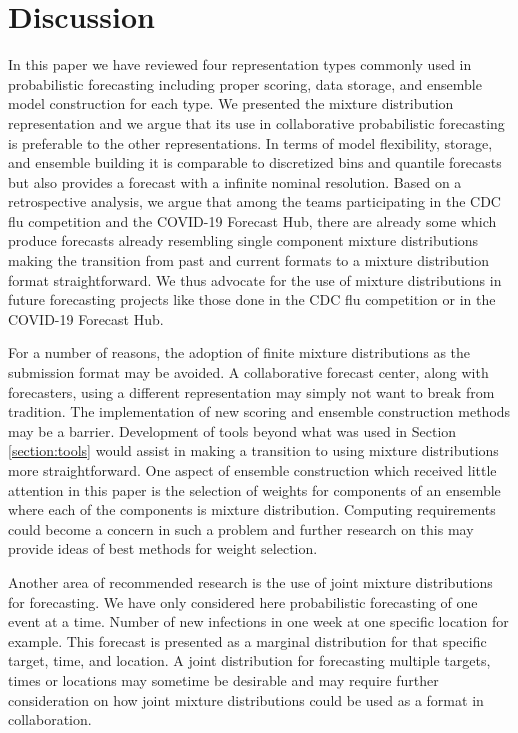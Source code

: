 \documentclass[11pt,notitlepage]{isuthesis}
\begin{document}
\chapter{Discussion}

In this paper we have reviewed four representation types commonly used in
probabilistic 
forecasting including proper scoring, data storage, and ensemble model 
construction for each type. We presented the mixture distribution
representation and we argue that its use in collaborative probabilistic 
forecasting is preferable to the other representations.
In terms of model flexibility, storage, and 
ensemble building it is
comparable to discretized bins and quantile forecasts but also provides a 
forecast with a infinite nominal resolution. Based on a retrospective analysis,
we argue that among the teams participating in the CDC flu
competition and the COVID-19 Forecast Hub, there are already some which produce
forecasts already resembling single component mixture distributions making the 
transition from past and current formats to a mixture distribution format 
straightforward.
We thus advocate for the use of mixture distributions in
future forecasting projects like those done in the CDC flu competition or in the
COVID-19 Forecast Hub.

For a number of reasons, the adoption of finite mixture distributions as the
submission format may be avoided. A collaborative forecast center, along with 
forecasters, using a 
different representation may simply not want to break from tradition. The 
implementation of new scoring and ensemble construction methods may be a 
barrier. Development of tools beyond what was used in Section 
\ref{section:tools} would assist in making a transition to using mixture 
distributions more straightforward.
One aspect of ensemble construction which received little attention in 
this paper is the selection of weights for components of an ensemble where each
of the components is mixture distribution. Computing requirements could become a
concern in such a problem and further research on this may provide
ideas of best methods for weight selection.

Another area of recommended research is the use of joint mixture distributions 
for 
forecasting. We have only considered here probabilistic forecasting of one 
event at a time. Number of new infections in one week at one specific location
for example. This forecast is presented as a marginal distribution for that 
specific target, time, and location. A joint distribution for forecasting 
multiple targets, times or locations may sometime be desirable and may require
further consideration on how joint mixture distributions could be used as a 
format in collaboration.
\end{document}
